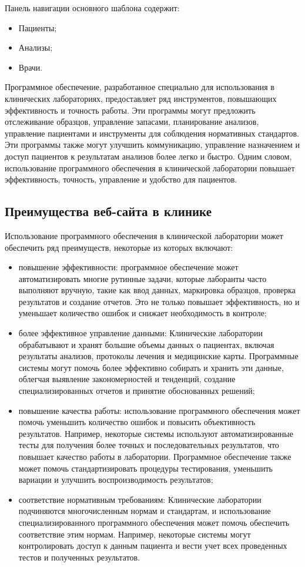 Панель навигации основного шаблона содержит:

\begin{itemize}
	\item Пациенты;
	\item Анализы;
	\item Врачи.
\end{itemize}

Программное обеспечение, разработанное специально для использования в клинических лабораториях, предоставляет ряд инструментов, повышающих эффективность и точность работы. Эти программы могут предложить отслеживание образцов, управление запасами, планирование анализов, управление пациентами и инструменты для соблюдения нормативных стандартов. Эти программы также могут улучшить коммуникацию, управление назначением и доступ пациентов к результатам анализов более легко и быстро. Одним словом, использование программного обеспечения в клинической лаборатории повышает эффективность, точность, управление и удобство для пациентов\cite{html}.

\subsection{Преимущества веб-сайта в клинике}

Использование программного обеспечения в клинической лаборатории может обеспечить ряд преимуществ, некоторые из которых включают:
\begin{itemize}
	\item повышение эффективности: программное обеспечение может автоматизировать многие рутинные задачи, которые лаборанты часто выполняют вручную, такие как ввод данных, маркировка образцов, проверка результатов и создание отчетов. Это не только повышает эффективность, но и уменьшает количество ошибок и снижает необходимость в контроле;
	\item более эффективное управление данными: Клинические лаборатории обрабатывают и хранят большие объемы данных о пациентах, включая результаты анализов, протоколы лечения и медицинские карты. Программные системы могут помочь более эффективно собирать и хранить эти данные, облегчая выявление закономерностей и тенденций, создание специализированных отчетов и принятие обоснованных решений;
	\item повышение качества работы: использование программного обеспечения может помочь уменьшить количество ошибок и повысить объективность результатов. Например, некоторые системы используют автоматизированные тесты для получения более точных и последовательных результатов, что повышает качество работы в лаборатории. Программное обеспечение также может помочь стандартизировать процедуры тестирования, уменьшить вариации и улучшить воспроизводимость результатов;
	\item  соответствие нормативным требованиям: Клинические лаборатории подчиняются многочисленным нормам и стандартам, и использование специализированного программного обеспечения может помочь обеспечить соответствие этим нормам. Например, некоторые системы могут контролировать доступ к данным пациента и вести учет всех проведенных тестов и полученных результатов.
\end{itemize}

